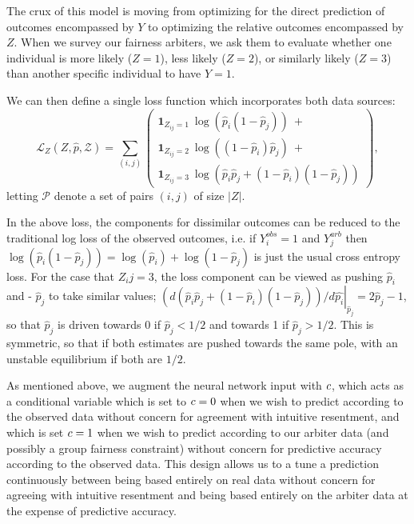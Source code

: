     The crux of this model is moving from optimizing for the direct prediction of outcomes encompassed by $Y$ to optimizing the relative outcomes encompassed by $Z$.  When we survey our fairness arbiters, we ask them to evaluate whether one individual is more likely ($Z = 1$), less likely ($Z = 2$), or similarly likely ($Z = 3$) than another specific individual to have $Y = 1$.
    
    We can then define a single loss function which incorporates both data sources:
    $$ \mathcal{L}_Z(Z, \hat{p}, \mathcal{Z}) = \sum\limits_{(i, j)} \left(\begin{array}{l} 
        \mathbf{1}_{Z_{ij} = 1} ~ \log\left( \hat{p}_i (1 - \hat{p}_j)  \right) ~ + \\
        \mathbf{1}_{Z_{ij} = 2} ~ \log\left( (1 - \hat{p}_i) \hat{p}_j  \right) ~ + \\
        \mathbf{1}_{Z_{ij} = 3} ~ \log\left(\hat{p}_i \hat{p}_j + (1 - \hat{p}_i)(1 - \hat{p}_j) \right)
        \end{array}\right), \label{eq:sm_pairwise_loss}$$
    letting $\mathcal{P}$ denote a set of pairs $(i, j)$ of size $|Z|$.
    
    In the above loss, the components for dissimilar outcomes can be reduced to the traditional log loss of the observed outcomes, i.e. if $Y_i^{obs} = 1$ and $Y_j^{arb}$ then 
        $ \log\left( \hat{p}_i (1 - \hat{p}_j)  \right) = \log\left( \hat{p}_i \right) + \log\left(1 - \hat{p}_j  \right)$ 
    is just the usual cross entropy loss.  For the case that $Z_ij = 3$, the loss component can be viewed as pushing $\hat{p}_i$ and  - $\hat{p}_j$ to take similar values; $\left(d \left(\hat{p}_i \hat{p}_j + (1 - \hat{p}_i)(1 - \hat{p}_j) \right)/d\hat{p_i}\right|_{\hat{p}_j} = 2\hat{p}_j - 1$, so that $\hat{p}_j$ is driven towards 0 if $\hat{p}_j < 1/2$ and towards 1 if $\hat{p}_j > 1/2$.  This is symmetric, so that if both estimates are pushed towards the same pole, with an unstable equilibrium if both are $1/2$.

    As mentioned above, we augment the neural network input with $c$, which acts as a conditional variable which is set to $c = 0$ when we wish to predict according to the observed data without concern for agreement with intuitive resentment, and which is set $c = 1$ when we wish to predict according to our arbiter data (and possibly a group fairness constraint) without concern for predictive accuracy according to the observed data.  This design allows us to a tune a prediction continuously between being based entirely on real data without concern for agreeing with intuitive resentment and being based entirely on the arbiter data at the expense of predictive accuracy.
    
